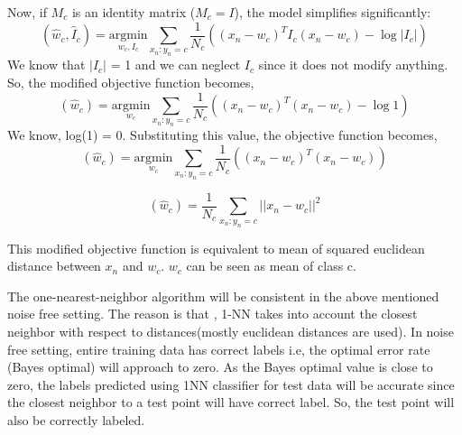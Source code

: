 \documentclass[a4paper,11pt]{article}
\begin{document}
\begin{mlsolution}
\begin{enumerate}
	Now, if $ M_c $ is an identity matrix ($ M_c = I $), the model simplifies significantly:
	\begin{equation*}
		(\hat{w}_c, \hat{I}_c) = \underset{w_c, I_c}{\text{argmin}} \sum_{x_n: y_n = c} \frac{1}{N_c} \left((x_n - w_c)^T I_c (x_n - w_c) - \log |I_c|\right)
	\end{equation*}
	We know that $|I_c|$ = 1 and we can neglect $I_c$ since it does not modify anything.
	So, the modified objective function becomes,
	\begin{equation*}
		(\hat{w}_c) = \underset{w_c}{\text{argmin}} \sum_{x_n: y_n = c} \frac{1}{N_c} \left((x_n - w_c)^T(x_n - w_c) - \log 1\right)
	\end{equation*}
	We know, log(1) = 0. Substituting this value, the objective function becomes,
	\begin{equation*}
		(\hat{w}_c) = \underset{w_c}{\text{argmin}} \sum_{x_n: y_n = c} \frac{1}{N_c} \left((x_n - w_c)^T(x_n - w_c) \right)
	\end{equation*}
	
	\begin{equation*}
		(\hat{w}_c) = \frac{1}{N_c} \sum_{x_n:y_n=c} ||x_n - w_c||^2		
	\end{equation*}
	
	This modified objective function is equivalent to mean of squared euclidean distance between $x_n$ and $w_c$.
	$w_c$ can be seen as mean of class c. 
	\end{enumerate}
\end{mlsolution}


\begin{mlsolution} 

The one-nearest-neighbor algorithm will be consistent in the above mentioned noise free setting. The reason is that , 1-NN takes into account the closest neighbor with respect to distances(mostly euclidean distances are used). In noise free setting, entire training data has correct labels i.e, the optimal error rate (Bayes optimal) will approach to zero. As the Bayes optimal value is close to zero, the labels predicted using 1NN classifier for test data will be accurate since the closest neighbor to a test point will have correct label. So, the test point will also be correctly labeled.


\end{mlsolution}
\end{document}
